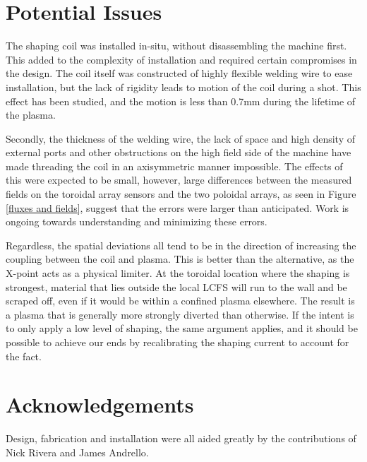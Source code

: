 \documentclass[aps,prl,twocolumn,superscriptaddress,groupedaddress]{revtex4}  %
\begin{document}
\section{Potential Issues}
	The shaping coil was installed in-situ, without disassembling the machine first.  This added to the complexity of installation and required certain compromises in the design.  The coil itself was constructed of highly flexible welding wire to ease installation, but the lack of rigidity leads to motion of the coil during a shot.  This effect has been studied, and the motion is less than 0.7mm during the lifetime of the plasma.\par
Secondly, the thickness of the welding wire, the lack of space and high density of external ports and other obstructions on the high field side of the machine have made threading the coil in an axisymmetric manner impossible.  The effects of this were expected to be small, however, large differences between the measured fields on the toroidal array sensors and the two poloidal arrays, as seen in Figure \ref{fluxes and fields}, suggest that the errors were larger than anticipated.  Work is ongoing towards understanding and minimizing these errors.\par
Regardless, the spatial deviations all tend to be in the direction of increasing the coupling between the coil and plasma.  This is better than the alternative, as the X-point acts as a physical limiter.  At the toroidal location where the shaping is strongest, material that lies outside the local LCFS will run to the wall and be scraped off, even if it would be within a confined plasma elsewhere.  The result is a plasma that is generally more strongly diverted than otherwise.  If the intent is to only apply a low level of shaping, the same argument applies, and it should be possible to achieve our ends by recalibrating the shaping current to account for the fact.

\section{Acknowledgements}
Design, fabrication and installation were all aided greatly by the contributions of Nick Rivera and James Andrello.\\
\end{document}
